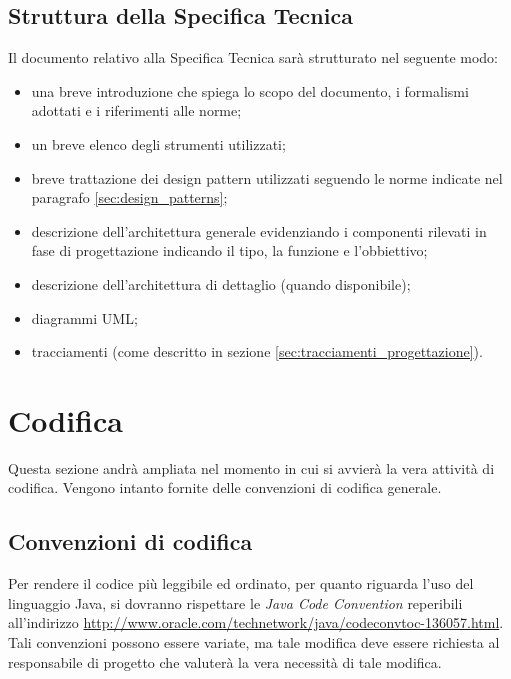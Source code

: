 {\subsection{Struttura della Specifica Tecnica}
Il documento relativo alla Specifica Tecnica sarà strutturato nel seguente modo:
\begin{itemize}
\item una breve introduzione che spiega lo scopo del documento, i formalismi adottati e i riferimenti alle norme;
\item un breve elenco degli strumenti utilizzati;
\item breve trattazione dei design pattern utilizzati seguendo le norme indicate nel paragrafo \ref{sec:design_patterns};
\item descrizione dell'architettura generale evidenziando i componenti rilevati in fase di progettazione indicando il tipo, la funzione e l'obbiettivo;
\item descrizione dell'architettura di dettaglio (quando disponibile);
\item diagrammi UML;
\item tracciamenti (come descritto in sezione \ref{sec:tracciamenti_progettazione}).
\end{itemize}

\newpage
\section{Codifica}
Questa sezione andrà ampliata nel momento in cui si avvierà la vera attività di codifica. Vengono intanto fornite delle convenzioni di codifica generale.

\subsection{Convenzioni di codifica}
Per rendere il codice più leggibile ed ordinato, per quanto riguarda l'uso del linguaggio Java, si dovranno rispettare le \textit{Java Code Convention} reperibili all'indirizzo \url{http://www.oracle.com/technetwork/java/codeconvtoc-136057.html}. Tali convenzioni possono essere variate, ma tale modifica deve essere richiesta al responsabile di progetto che valuterà la vera necessità di tale modifica.

}

